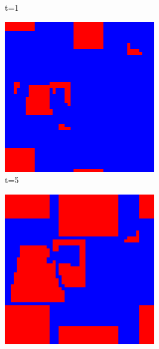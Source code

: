 \documentclass[a4paper, 11pt]{article}
\begin{document}
\begin{figure}[H]
\begin{subfigure}{.16\textwidth}
  \caption{t=1}
\end{subfigure}%
\begin{subfigure}{.16\textwidth}
  \centering
  \includegraphics[width=0.9\linewidth]{PRISONERS_DILEMMA_MOORE_50x50_t05}
  \caption{t=5}
\end{subfigure}
\begin{subfigure}{.16\textwidth}
  \centering
  \includegraphics[width=0.9\linewidth]{PRISONERS_DILEMMA_MOORE_50x50_t10}

\end{subfigure}
\end{figure}
\end{document}
